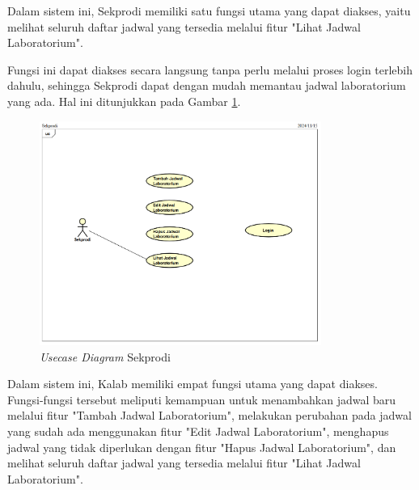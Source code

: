 Dalam sistem ini, Sekprodi memiliki satu fungsi utama yang dapat diakses, yaitu melihat seluruh daftar jadwal yang tersedia melalui fitur "Lihat Jadwal Laboratorium".

Fungsi ini dapat diakses secara langsung tanpa perlu melalui proses login terlebih dahulu, sehingga Sekprodi dapat dengan mudah memantau jadwal laboratorium yang ada. Hal ini ditunjukkan pada Gambar \ref{usecase-diagram-sekprodi}.
\begin{figure}
	\centering
	\includegraphics[width=0.82\textwidth]{konten/gambar/usecase-diagram/sekprodi.png}
	\caption{\textit{Usecase Diagram} Sekprodi}
	\label{usecase-diagram-sekprodi}
\end{figure}

Dalam sistem ini, Kalab memiliki empat fungsi utama yang dapat diakses. Fungsi-fungsi tersebut meliputi kemampuan untuk menambahkan jadwal baru melalui fitur "Tambah Jadwal Laboratorium", melakukan perubahan pada jadwal yang sudah ada menggunakan fitur "Edit Jadwal Laboratorium", menghapus jadwal yang tidak diperlukan dengan fitur "Hapus Jadwal Laboratorium", dan melihat seluruh daftar jadwal yang tersedia melalui fitur "Lihat Jadwal Laboratorium".

